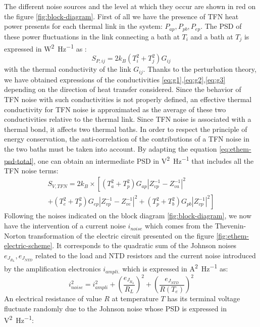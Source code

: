 The different noise sources and the level at which they occur are shown in red on the figure \ref{fig:block-diagram}. First of all we have the presence of TFN heat power presents for each thermal link in the system: $P_{ap}, P_{pb}, P_{ep}$. The PSD of these power fluctuations in the link connecting a bath at $T_i$ and a bath at $T_j$ is expressed in \si{\watt^2\per\Hz} as
\cite{Juillard:1999} \cite{Ashcroft:1976} :
\begin{equation}
S_{P,ij} = 2k_B(T_i^2 + T_j^2) G_{ij}
\end{equation}
with the thermal conductivity of the link $G_{ij}$.
Thanks to the perturbation theory, we have obtained expressions of the conductivities \ref{eq:g1},\ref{eq:g2},\ref{eq:g3} depending on the direction of heat transfer considered. Since the behavior of TFN noise with such conductivities is not properly defined, an effective thermal conductivity for TFN noise is approximated as the average of these two conductivities relative to the thermal link. Since TFN noise is associated with a thermal bond, it affects two thermal baths. In order to respect the principle of energy conservation, the anti-correlation of the contributions of a TFN noise in the two baths must be taken into account. By adapting the equation \ref{eq:ethem-psd-total}, one can obtain an intermediate PSD in \si{\volt^2\per\Hz} that includes all the TFN noise terms:
\begin{multline}
S_{V,TFN} = 2k_B \times  \left[ (T_a^2 + T_p^2) G_{ap} \left\vert Z_{vp}^{-1} - Z_{va}^{-1} \right\vert^2 \right. \\ \left. + (T_e^2 + T_p^2) G_{ep} \left\vert Z_{vp}^{-1} - Z_{ve}^{-1} \right\vert^2 + (T_p^2 + T_b^2) G_{pb} \left\vert Z_{vp}^{-1}\right\vert^2 \right]
\end{multline}
Following the noises indicated on the block diagram \ref{fig:block-diagram}, we now have the intervention of a current noise $i_{noise}$ which comes from the Thevenin-Norton transformation of the electric circuit presented on the figure \ref{fig:ethem-electric-scheme}. It corresponds to the quadratic sum of the Johnson noises $e_{J_{R_L}}, e_{J_{NTD}}$ related to the load and NTD resistors and the current noise introduced by the amplification electronics $i_{ampli.}$ which is expressed in \si{\ampere^2\per\Hz} as: 
\begin{equation}
\label{i-bruit}
i_{noise}^2 = i_{ampli}^2 + \left( \frac{e_{J_{R_L}}}{R_L} \right)^2 + \left( \frac{e_{J_{NTD}}}{R(T_e)} \right)^2
\end{equation}
An electrical resistance of value $R$ at temperature $T$ has its terminal voltage fluctuate randomly due to the Johnson noise whose PSD is expressed in \si{\volt^2\per\Hz}:
